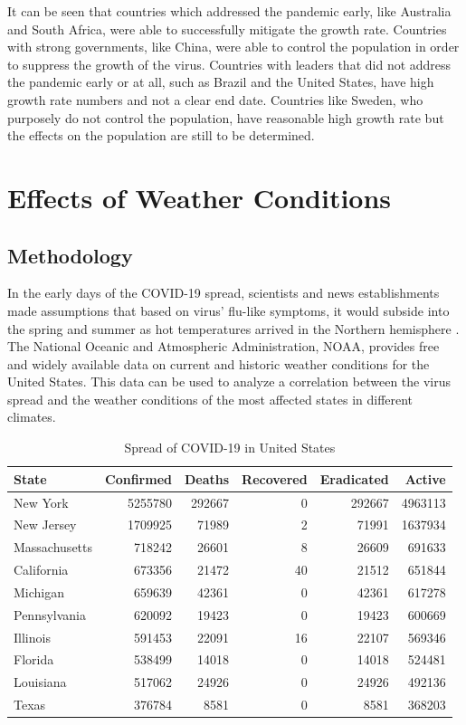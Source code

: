 \documentclass{homework}
\begin{document}
It can be seen that countries which addressed the pandemic early, like Australia and South Africa, were able to successfully mitigate the growth rate. Countries with strong governments, like China, were able to control the population in order to suppress the growth of the virus. Countries with leaders that did not address the pandemic early or at all, such as Brazil and the United States, have high growth rate numbers and not a clear end date. Countries like Sweden, who purposely do not control the population, have reasonable high growth rate but the effects on the population are still to be determined. 

\newpage
\section{Effects of Weather Conditions}
\subsection{Methodology}

In the early days of the COVID-19 spread, scientists and news establishments made assumptions that based on virus' flu-like symptoms, it would subside into the spring and summer as hot temperatures arrived in the Northern hemisphere \cite{aubrey_2020}. The National Oceanic and Atmospheric Administration, NOAA, provides free and widely available data on current and historic weather conditions for the United States. This data can be used to analyze a correlation between the virus spread and the weather conditions of the most affected states in different climates.

\begin{table}[H]
  \caption{Spread of COVID-19 in United States}
  \label{Task 4 States}
  \centering
  \begin{tabular}{lrrrrr}
    \toprule
    State         & Confirmed & Deaths & Recovered & Eradicated & Active  \\
    \midrule
    New York      & 5255780   & 292667 & 0         & 292667     & 4963113 \\
    New Jersey    & 1709925   & 71989  & 2         & 71991      & 1637934 \\
    Massachusetts & 718242    & 26601  & 8         & 26609      & 691633  \\
    California    & 673356    & 21472  & 40        & 21512      & 651844  \\
    Michigan      & 659639    & 42361  & 0         & 42361      & 617278  \\
    Pennsylvania  & 620092    & 19423  & 0         & 19423      & 600669  \\
    Illinois      & 591453    & 22091  & 16        & 22107      & 569346  \\
    Florida       & 538499    & 14018  & 0         & 14018      & 524481  \\
    Louisiana     & 517062    & 24926  & 0         & 24926      & 492136  \\
    Texas         & 376784    & 8581   & 0         & 8581       & 368203  \\
    \bottomrule
  \end{tabular}
\end{table}
\end{document}
